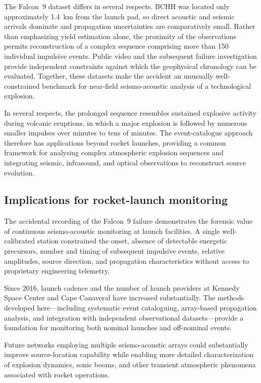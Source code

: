 \documentclass[]{seismica}
\begin{document}
The Falcon~9 dataset differs in several respects. BCHH was located only approximately 1.4~km from the launch pad, so direct acoustic and seismic arrivals dominate and propagation uncertainties are comparatively small. Rather than emphasizing yield estimation alone, the proximity of the observations permits reconstruction of a complex sequence comprising more than 150 individual impulsive events. Public video and the subsequent failure investigation provide independent constraints against which the geophysical chronology can be evaluated. Together, these datasets make the accident an unusually well-constrained benchmark for near-field seismo-acoustic analysis of a technological explosion.

In several respects, the prolonged sequence resembles sustained explosive activity during volcanic eruptions, in which a major explosion is followed by numerous smaller impulses over minutes to tens of minutes. The event-catalogue approach therefore has applications beyond rocket launches, providing a common framework for analysing complex atmospheric explosion sequences and integrating seismic, infrasound, and optical observations to reconstruct source evolution.

\subsection{Implications for rocket-launch monitoring}
\label{sec:discussion_monitoring}

The accidental recording of the Falcon~9 failure demonstrates the forensic
value of continuous seismo-acoustic monitoring at launch facilities. A single
well-calibrated station constrained the onset, absence of detectable energetic
precursors, number and timing of subsequent impulsive events, relative
amplitudes, source direction, and propagation characteristics without access to
proprietary engineering telemetry.

Since 2016, launch cadence and the number of launch providers at Kennedy Space Center and Cape Canaveral have increased substantially. The methods developed here---including systematic event cataloguing, array-based propagation analysis, and integration with independent observational datasets---provide a foundation for monitoring both nominal launches and off-nominal events.

Future networks employing multiple seismo-acoustic arrays could substantially improve source-location capability while enabling more detailed characterization of explosion dynamics, sonic booms, and other transient atmospheric phenomena associated with rocket operations.
\end{document}
